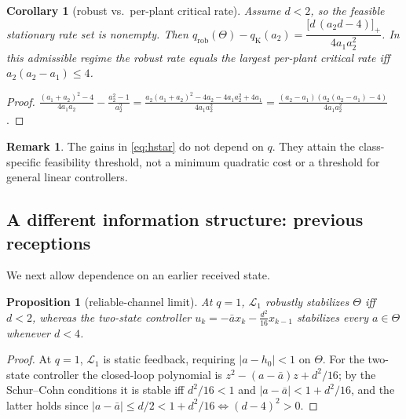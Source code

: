 \documentclass[preprint,12pt,numbers]{elsarticle}
\newtheorem{proposition}{Proposition}
\newtheorem{corollary}{Corollary}
\theoremstyle{definition}
\newtheorem{remark}{Remark}
\newcommand{\Lone}{\mathcal{L}_1}
\newcommand{\abar}{\bar a}
\newcommand{\qK}{q_{\mathrm K}}
\newcommand{\qrob}{q_{\mathrm{rob}}}
\begin{document}
\begin{corollary}[robust vs.\ per-plant critical rate]\label{cor:gap}
Assume $d<2$, so the feasible stationary rate set is nonempty. Then $\qrob(\Theta)-\qK(a_2)=\dfrac{\bigl[d\,(a_2d-4)\bigr]_+}{4a_1a_2^2}$. In this admissible regime the robust rate equals the largest per-plant critical rate iff $a_2(a_2-a_1)\le4$.
\end{corollary}
\begin{proof}
$\frac{(a_1+a_2)^2-4}{4a_1a_2}-\frac{a_2^2-1}{a_2^2}=\frac{a_2(a_1+a_2)^2-4a_2-4a_1a_2^2+4a_1}{4a_1a_2^2}=\frac{(a_2-a_1)(a_2(a_2-a_1)-4)}{4a_1a_2^2}$.
\end{proof}

\begin{remark}
The gains in \eqref{eq:hstar} do not depend on $q$. They attain the class-specific feasibility threshold, not a minimum quadratic cost or a threshold for general linear controllers.
\end{remark}

\subsection{A different information structure: previous receptions}\label{sec:older}

We next allow dependence on an earlier received state.

\begin{proposition}[reliable-channel limit]\label{prop:q1}
At $q=1$, $\Lone$ robustly stabilizes $\Theta$ iff $d<2$, whereas the two-state controller $u_k=-\abar x_k-\frac{d^2}{16}x_{k-1}$ stabilizes every $a\in\Theta$ whenever $d<4$.
\end{proposition}
\begin{proof}
At $q=1$, $\Lone$ is static feedback, requiring $|a-h_0|<1$ on $\Theta$. For the two-state controller the closed-loop polynomial is $z^2-(a-\abar)z+d^2/16$; by the Schur--Cohn conditions it is stable iff $d^2/16<1$ and $|a-\abar|<1+d^2/16$, and the latter holds since $|a-\abar|\le d/2<1+d^2/16\iff(d-4)^2>0$.
\end{proof}
\end{document}
